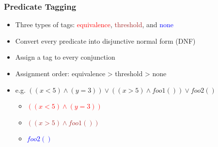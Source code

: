 \documentclass[mathserif,14pt,xcolor=table]{beamer}
\begin{document}
    
\begin{frame}
    \frametitle{Predicate Tagging}
    \begin{itemize}
        \item Three types of tags: \textcolor{red}{equivalence},
            \textcolor{brown}{threshold}, and \textcolor{blue}{none}
        \item Convert every predicate into disjunctive normal form (DNF)
        \item Assign a tag to every conjunction 
        \item Assignment order: equivalence > threshold > none
        \item e.g. $((x<5) \wedge (y=3)) \vee ((x > 5) \wedge foo1()) \vee
            foo2()$
            \begin{itemize}
                \item \textcolor{red}{$((x < 5) \wedge (y=3))$} 
                \item \textcolor{brown}{$((x > 5) \wedge foo1())$} 
                \item \textcolor{blue}{$foo2()$}
            \end{itemize}
    \end{itemize}
\end{frame}
\end{document}
